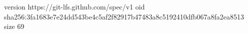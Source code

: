 version https://git-lfs.github.com/spec/v1
oid sha256:3fa1683e7e24dd543be4c5af2f82917b47483a8c5192410dfb067a8fa2ea8513
size 69
